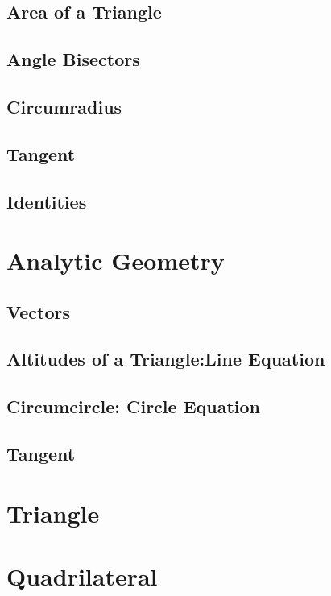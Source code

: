 \documentclass[11pt]{book}
\begin{document}
\section{Area of a Triangle}

\section{Angle Bisectors}

\section{Circumradius}

\section{Tangent}

\section{Identities}

\chapter{Analytic Geometry}
\section{Vectors}

\section{Altitudes of a Triangle:Line Equation}

\section{Circumcircle: Circle Equation}

\section{Tangent}

\chapter{Triangle}

\chapter{Quadrilateral}

%
\end{document}
